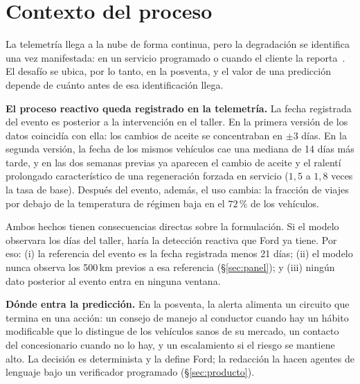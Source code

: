 \section{Contexto del proceso}
\label{sec:proceso}

La telemetría llega a la nube de forma continua, pero la degradación se identifica una vez manifestada: en un servicio
programado o cuando el cliente la reporta~\cite{ford}. El desafío se ubica, por lo tanto, en la posventa, y el valor de una
predicción depende de cuánto antes de esa identificación llega.

\textbf{El proceso reactivo queda registrado en la telemetría.} La fecha registrada del evento es posterior a la intervención
en el taller. En la primera versión de los datos coincidía con ella: los cambios de aceite se concentraban en $\pm 3$ días. En la
segunda versión, la fecha de los mismos vehículos cae una mediana de 14 días más tarde, y en las dos semanas previas ya
aparecen el cambio de aceite y el ralentí prolongado característico de una regeneración forzada en servicio ($1{,}5$ a
$1{,}8$ veces la tasa de base). Después del evento, además, el uso cambia: la fracción de viajes por debajo de la temperatura
de régimen baja en el $72\,\%$ de los vehículos.

Ambos hechos tienen consecuencias directas sobre la formulación. Si el modelo observara los días del taller, haría la
detección reactiva que Ford ya tiene. Por eso: (i) la referencia del evento es la fecha registrada menos 21 días; (ii) el
modelo nunca observa los 500\,km previos a esa referencia (\S\ref{sec:panel}); y (iii) ningún dato posterior al evento entra
en ninguna ventana.

\textbf{Dónde entra la predicción.} En la posventa, la alerta alimenta un circuito que termina en una acción: un consejo
de manejo al conductor cuando hay un hábito modificable que lo distingue de los vehículos sanos de su mercado, un contacto
del concesionario cuando no lo hay, y un escalamiento si el riesgo se mantiene alto. La decisión es determinista y la define
Ford; la redacción la hacen agentes de lenguaje bajo un verificador programado (\S\ref{sec:producto}).
